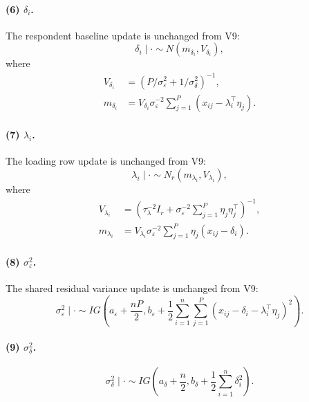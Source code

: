 \documentclass[11pt]{article}
\begin{document}
\paragraph{(6) $\delta_i$.}
The respondent baseline update is unchanged from V9:
\begin{equation}
    \delta_i\mid\cdot\sim N(m_{\delta_i},V_{\delta_i}),
\end{equation}
where
\begin{align}
    V_{\delta_i}
    &=\left(P/\sigma_\varepsilon^2+1/\sigma_\delta^2\right)^{-1},\\
    m_{\delta_i}
    &=V_{\delta_i}\sigma_\varepsilon^{-2}
    \sum_{j=1}^P(x_{ij}-\lambda_i^\top\eta_j).
\end{align}

\paragraph{(7) $\lambda_i$.}
The loading row update is unchanged from V9:
\begin{equation}
    \lambda_i\mid\cdot\sim N_r(m_{\lambda_i},V_{\lambda_i}),
\end{equation}
where
\begin{align}
    V_{\lambda_i}
    &=\left(\tau_\lambda^{-2}I_r+
    \sigma_\varepsilon^{-2}\sum_{j=1}^P\eta_j\eta_j^\top\right)^{-1},\\
    m_{\lambda_i}
    &=V_{\lambda_i}\sigma_\varepsilon^{-2}
    \sum_{j=1}^P\eta_j(x_{ij}-\delta_i).
\end{align}

\paragraph{(8) $\sigma_\varepsilon^2$.}
The shared residual variance update is unchanged from V9:
\begin{equation}
    \sigma_\varepsilon^2\mid\cdot
    \sim
    IG\left(
    a_\varepsilon+\frac{nP}{2},
    b_\varepsilon+\frac{1}{2}
    \sum_{i=1}^n\sum_{j=1}^P
    (x_{ij}-\delta_i-\lambda_i^\top\eta_j)^2
    \right).
\end{equation}

\paragraph{(9) $\sigma_\delta^2$.}
\begin{equation}
    \sigma_\delta^2\mid\cdot
    \sim
    IG\left(a_\delta+\frac n2,
    b_\delta+\frac{1}{2}\sum_{i=1}^n\delta_i^2\right).
\end{equation}
\end{document}
